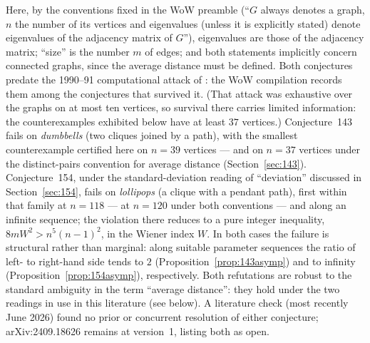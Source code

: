 \documentclass[11pt]{article}
\theoremstyle{remark}
\begin{document}
\noindent
Here, by the conventions fixed in the WoW preamble (``$G$ always denotes a
graph, $n$ the number of its vertices and eigenvalues (unless it is
explicitly stated) denote eigenvalues of the adjacency matrix of $G$''),
eigenvalues are those of the adjacency matrix; ``size'' is the number $m$ of
edges; and both statements implicitly concern connected graphs, since the
average distance must be defined. Both conjectures predate the 1990--91
computational attack of \cite{BDF1995}: the WoW compilation records them
among the conjectures that survived it. (That attack was exhaustive over
the graphs on at most ten vertices, so survival there carries limited
information: the counterexamples exhibited below have at least $37$
vertices.) Conjecture~143 fails on
\emph{dumbbells} (two cliques joined by a path), with the smallest
counterexample certified here on $n=39$ vertices --- and on $n=37$ vertices under the
distinct-pairs convention for average distance (Section~\ref{sec:143}).
Conjecture~154, under the standard-deviation reading of ``deviation''
discussed in Section~\ref{sec:154}, fails on \emph{lollipops} (a clique with
a pendant path), first within that family at $n=118$ --- at $n=120$ under
both conventions --- and along an infinite sequence; the violation there
reduces to a pure integer inequality, $8mW^2 > n^5(n-1)^2$, in the Wiener
index $W$. In both
cases the failure is structural rather than marginal: along suitable
parameter sequences the ratio of left- to right-hand side tends to $2$
(Proposition~\ref{prop:143asymp}) and to infinity
(Proposition~\ref{prop:154asymp}), respectively. Both refutations are
robust to the standard ambiguity in the term ``average distance'': they hold
under the two readings in use in this literature (see below). A literature
check (most recently June 2026) found no prior or concurrent resolution of
either conjecture; arXiv:2409.18626 \cite{RoucairolCazenave2025} remains at
version~1, listing both as open.
\end{document}
